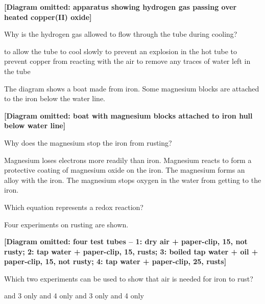 \documentclass[11pt]{exam}
\begin{document}
\begin{questions}
\textbf{[Diagram omitted: apparatus showing hydrogen gas passing over heated copper(II) oxide]}

Why is the hydrogen gas allowed to flow through the tube during cooling?

\begin{choices}
\choice to allow the tube to cool slowly
\choice to prevent an explosion in the hot tube
\choice to prevent copper from reacting with the air
\choice to remove any traces of water left in the tube
\end{choices}

\newpage

\question The diagram shows a boat made from iron. Some magnesium blocks are attached to the iron below the water line.

\textbf{[Diagram omitted: boat with magnesium blocks attached to iron hull below water line]}

Why does the magnesium stop the iron from rusting?

\begin{choices}
\choice Magnesium loses electrons more readily than iron.
\choice Magnesium reacts to form a protective coating of magnesium oxide on the iron.
\choice The magnesium forms an alloy with the iron.
\choice The magnesium stops oxygen in the water from getting to the iron.
\end{choices}

\question Which equation represents a redox reaction?

\begin{choices}
\choice {}
\choice {}
\choice {}
\choice {}
\end{choices}

\question Four experiments on rusting are shown.

\textbf{[Diagram omitted: four test tubes -- 1: dry air + paper-clip, 15\celsius, not rusty; 2: tap water + paper-clip, 15\celsius, rusts; 3: boiled tap water + oil + paper-clip, 15\celsius, not rusty; 4: tap water + paper-clip, 25\celsius, rusts]}

Which two experiments can be used to show that air is needed for iron to rust?

\begin{choices}
 and 3 only
 and 4 only
 and 3 only
 and 4 only
\end{choices}


\end{questions}
\end{document}
